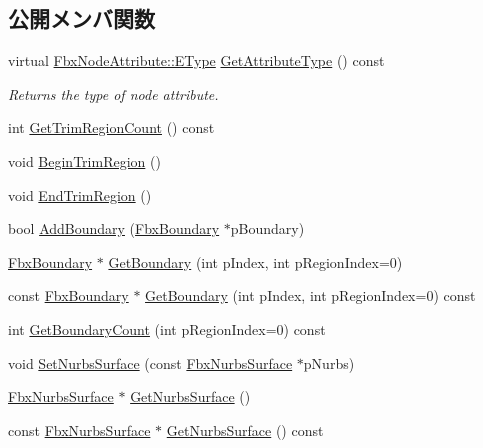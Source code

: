 \subsection*{公開メンバ関数}
\begin{DoxyCompactItemize}
\item 
virtual \hyperlink{class_fbx_node_attribute_a08e1669d3d1a696910756ab17de56d6a}{Fbx\+Node\+Attribute\+::\+E\+Type} \hyperlink{class_fbx_trim_nurbs_surface_a2d60f9613978db561ac32e2efff35104}{Get\+Attribute\+Type} () const
\begin{DoxyCompactList}\small\item\em Returns the type of node attribute. \end{DoxyCompactList}\item 
int \hyperlink{class_fbx_trim_nurbs_surface_af9deaac6001549449325ca4112e3a58a}{Get\+Trim\+Region\+Count} () const
\item 
void \hyperlink{class_fbx_trim_nurbs_surface_aaec68af89d01b7f4bd76c2ec5e3eb837}{Begin\+Trim\+Region} ()
\item 
void \hyperlink{class_fbx_trim_nurbs_surface_a3490479b6c5121b3755c06d7d604c4b9}{End\+Trim\+Region} ()
\item 
bool \hyperlink{class_fbx_trim_nurbs_surface_ab1b07cf42bbc5ac750aaed3012ebeec6}{Add\+Boundary} (\hyperlink{class_fbx_boundary}{Fbx\+Boundary} $\ast$p\+Boundary)
\item 
\hyperlink{class_fbx_boundary}{Fbx\+Boundary} $\ast$ \hyperlink{class_fbx_trim_nurbs_surface_af42e403f540581bee858f76fbd39f6b5}{Get\+Boundary} (int p\+Index, int p\+Region\+Index=0)
\item 
const \hyperlink{class_fbx_boundary}{Fbx\+Boundary} $\ast$ \hyperlink{class_fbx_trim_nurbs_surface_a64eb1c82eb77f8e48a7da4ecea7c1f81}{Get\+Boundary} (int p\+Index, int p\+Region\+Index=0) const
\item 
int \hyperlink{class_fbx_trim_nurbs_surface_a95faf8ef0f87e4a329a7a7c0340dbd99}{Get\+Boundary\+Count} (int p\+Region\+Index=0) const
\item 
void \hyperlink{class_fbx_trim_nurbs_surface_ab255a3f5402aa8adb8d834af524ac291}{Set\+Nurbs\+Surface} (const \hyperlink{class_fbx_nurbs_surface}{Fbx\+Nurbs\+Surface} $\ast$p\+Nurbs)
\item 
\hyperlink{class_fbx_nurbs_surface}{Fbx\+Nurbs\+Surface} $\ast$ \hyperlink{class_fbx_trim_nurbs_surface_a59e3a2e5a7d89476e0bbd61dcf00aede}{Get\+Nurbs\+Surface} ()
\item 
const \hyperlink{class_fbx_nurbs_surface}{Fbx\+Nurbs\+Surface} $\ast$ \hyperlink{class_fbx_trim_nurbs_surface_a3fdd293d9f7a6c950e25bd4130772236}{Get\+Nurbs\+Surface} () const

\end{DoxyCompactItemize}
